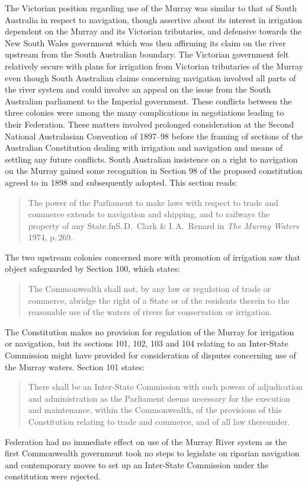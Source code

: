The Victorian position regarding use of the Murray was similar to that
of South Australia in respect to navigation, though assertive about
its interest in irrigation dependent on the Murray and its Victorian
tributaries, and defensive towards the New South Wales government
which was then affirming its claim on the river upstream from the
South Australian boundary.  The Victorian government felt relatively
secure with plans for irrigation from Victorian tributaries of the
Murray even though South Australian claims concerning navigation
involved all parts of the river system and could involve an appeal on
the issue from the South Australian parliament to the Imperial
government.  These conflicts between
the three colonies were among the many complications in negotiations
leading to their Federation.  These matters involved prolonged
consideration at the Second National Australasian Convention of
1897--98 before the framing of sections of the Australian Constitution
dealing with irrigation and navigation and means of settling any
future conflicts. South
Australian insistence on a right to navigation on the Murray gained
some recognition in Section 98 of the proposed constitution agreed to
in 1898 and subsequently adopted. This section reads:
\begin{quote}
	The power of the Parliament to make laws with respect to trade
	and commerce extends to navigation and shipping, and to
	railways the property of any State.fn{S.\,D.~Clark \&
	I.\,A.~Renard in \textsl{The Murray Waters} 1974, p.\,269.}
\end{quote}

The two upstream colonies concerned more with promotion of irrigation
saw that object safeguarded by Section 100, which states:
\begin{quote}
	The Commonwealth shall not, by any law or regulation of trade
	or commerce, abridge the right of a State or of the residents
	therein to the reasonable use of the waters of rivers for
	conservation or irrigation.
\end{quote}

The Constitution makes no provision for regulation of the Murray for
irrigation or navigation, but its sections 101, 102, 103 and 104
relating to an Inter-State Commission might have provided for
consideration of disputes concerning use of the Murray waters.
Section 101 states:
\begin{quote}
	There shall be an Inter-State Commission with such powers of
	adjudication and administration as the Parliament deems
	necessary for the execution and maintenance, within the
	Commonwealth, of the provisions of this Constitution relating
	to trade and commerce, and of all law thereunder.
\end{quote}
Federation had no immediate effect on use of the Murray River system
as the first Commonwealth government took no steps to legislate on
riparian navigation and contemporary moves to set up an Inter-State
Commission under the constitution were rejected.

